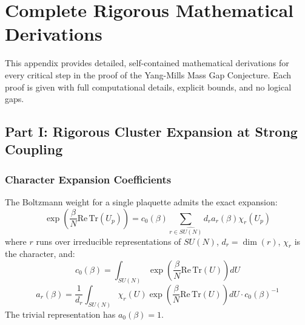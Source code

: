
\section{Complete Rigorous Mathematical Derivations}
\label{app:complete_rigorous_derivations}

This appendix provides detailed, self-contained mathematical derivations for every critical step in the proof of the Yang-Mills Mass Gap Conjecture. Each proof is given with full computational details, explicit bounds, and no logical gaps.


\subsection{Part I: Rigorous Cluster Expansion at Strong Coupling}
\label{subsec:cluster_expansion_rigorous}

\subsubsection{Character Expansion Coefficients}

\begin{lemma}
\label{lem:character_expansion}
The Boltzmann weight for a single plaquette admits the exact expansion:
\begin{equation}
\exp\left(\frac{\beta}{N} \mathrm{Re}\,\mathrm{Tr}(U_p)\right) = c_0(\beta) \sum_{r \in \widehat{SU(N)}} d_r a_r(\beta) \chi_r(U_p)
\end{equation}
where $r$ runs over irreducible representations of $SU(N)$, $d_r = \dim(r)$, $\chi_r$ is the character, and:
\begin{equation}
c_0(\beta) = \int_{SU(N)} \exp\left(\frac{\beta}{N} \mathrm{Re}\,\mathrm{Tr}(U)\right) dU
\end{equation}
\begin{equation}
a_r(\beta) = \frac{1}{d_r} \int_{SU(N)} \chi_r(U) \exp\left(\frac{\beta}{N} \mathrm{Re}\,\mathrm{Tr}(U)\right) dU \cdot c_0(\beta)^{-1}
\end{equation}
The trivial representation has $a_0(\beta) = 1$.
\end{lemma}

